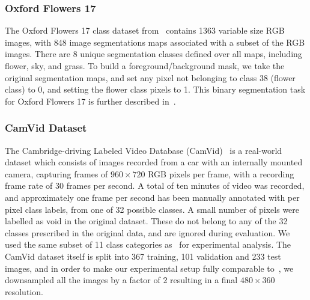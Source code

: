 \subsubsection{Oxford Flowers 17}
The Oxford Flowers 17 class dataset from~\cite{Nilsback06} contains 1363
variable size RGB images, with 848 image segmentations maps associated with
a subset of
the RGB images. There are 8 unique segmentation classes defined over all maps,
including flower, sky, and grass. To build a foreground/background mask,
we take the original segmentation maps, and set any pixel not belonging to
class 38 (flower class) to 0, and setting the flower class pixels to 1.
This binary segmentation task for Oxford Flowers 17 is further described
in~\cite{Xiaomeng14}.

\subsubsection{CamVid Dataset}
The Cambridge-driving Labeled Video Database
(CamVid)~\cite{Brostow2010semantic} is a real-world dataset which consists of
images recorded from a car with an internally mounted camera, capturing frames
of $960 \times 720$ RGB pixels per frame, with a recording frame rate of 30
frames per second. A total of ten minutes of video was recorded, and
approximately one frame per second has been manually annotated with per pixel
class labels, from one of 32 possible classes.  A small number of pixels were
labelled as void in the original dataset. These do not belong to any of the 32
classes prescribed in the original data, and are ignored during evaluation.  We
used the same subset of 11 class categories as~\cite{badrinarayanan2015segnet}
for experimental analysis.  The CamVid dataset itself is split into 367
training, 101 validation and 233 test images, and in order to make our
experimental setup fully comparable to~\cite{badrinarayanan2015segnet}, we
downsampled all the images by a factor of 2 resulting in a final $480 \times
360$ resolution.

